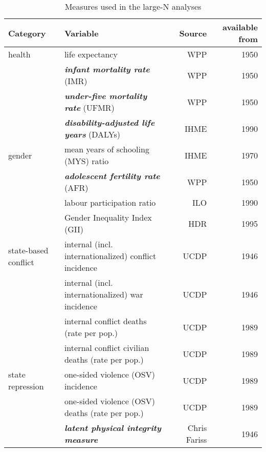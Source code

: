 \begin{table}[h]
\footnotesize
\centering
\caption{Measures used in the large-N analyses}
\label{table_vars}
\begin{tabular}{llrr}
\toprule
Category             & Variable                                                 & Source             & available from\\
\midrule
health               & life expectancy                                          & WPP                & 1950 \\
                     & \textbf{\textit{infant mortality rate}} (IMR)            & WPP                & 1950 \\
                     & \textbf{\textit{under-five mortality rate}} (UFMR)       & WPP                & 1950 \\
                     & \textbf{\textit{disability-adjusted life years}} (DALYs) & IHME               & 1990 \\
gender               & mean years of schooling (MYS) ratio                      & IHME               & 1970 \\
                     & \textbf{\textit{adolescent fertility rate}} (AFR)        & WPP                & 1950 \\
                     & labour participation ratio                               & ILO                & 1990 \\
                     & Gender Inequality Index (GII)                            & HDR                & 1995 \\
state-based conflict & internal (incl. internationalized) conflict incidence    & UCDP               & 1946 \\
                     & internal (incl. internationalized) war incidence         & UCDP               & 1946 \\
                     & internal conflict deaths (rate per pop.)                 & UCDP               & 1989 \\
                     & internal conflict civilian deaths (rate per pop.)        & UCDP               & 1989 \\
state repression     & one-sided violence (OSV) incidence                       & UCDP               & 1989 \\
                     & one-sided violence (OSV) deaths (rate per pop.)          & UCDP               & 1989 \\
                     & \textbf{\textit{latent physical integrity measure}}      & Chris Fariss       & 1946 \\

\end{tabular}
\end{table}
